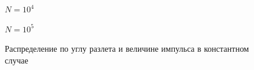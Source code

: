 \documentclass[12pt]{article}
\begin{document}
\begin{figure}
\begin{minipage}[h]{0.47\linewidth}
$N = 10^4$ \\
\end{minipage}
\hfill
\begin{minipage}[h]{0.47\linewidth}
$N = 10^5$\\
\end{minipage}
\caption{Распределение по углу разлета и величине импульса в константном случае}
\label{const_fig}
\end{figure}
\end{document}
